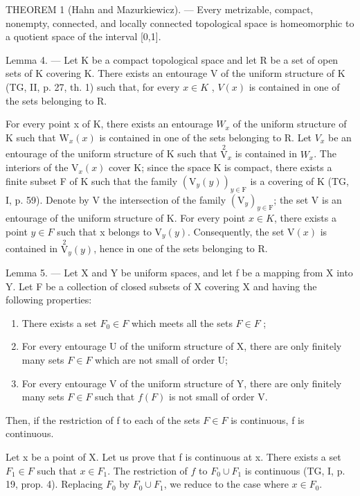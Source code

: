 THEOREM 1 (Hahn and Mazurkiewicz). --- Every metrizable, compact, nonempty, connected, and locally connected topological space is homeomorphic to a quotient space of the interval {[}0,1{]}.

Lemma 4. --- Let K be a compact topological space and let R be a set of open sets of K covering K. There exists an entourage V of the uniform structure of K (TG, II, p. 27, th. 1) such that, for every \(x \in K\) , \(V(x)\) is contained in one of the sets belonging to R.

For every point x of K, there exists an entourage \(W_{x}\) of the uniform structure of K such that \(\mathrm{W}_{x}(x)\) is contained in one of the sets belonging to R. Let \(V_{x}\) be an entourage of the uniform structure of K such that \(\overset{2}{\mathrm{V}}_{x}\) is contained in \(W_{x}\). The interiors of the \(\mathrm{V}_{x}(x)\) cover K; since the space K is compact, there exists a finite subset F of K such that the family \((\mathrm{V}_{y}(y))_{y\in\mathrm{F}}\) is a covering of K (TG, I, p. 59). Denote by V the intersection of the family \((\mathrm{V}_{y})_{y\in\mathrm{F}}\); the set V is an entourage of the uniform structure of K. For every point \(x\in K\), there exists a point \(y\in F\) such that x belongs to \(\mathrm{V}_{y}(y)\). Consequently, the set \(\mathrm{V}(x)\) is contained in \(\overset{2}{\mathrm{V}}_{y}(y)\), hence in one of the sets belonging to R.

Lemma 5. --- Let X and Y be uniform spaces, and let f be a mapping from X into Y. Let F be a collection of closed subsets of X covering X and having the following properties:

\begin{enumerate}
\def\labelenumi{(\roman{enumi})}
\item
  There exists a set \(F_{0} \in F\) which meets all the sets \(F \in F\) ;
\item
  For every entourage U of the uniform structure of X, there are only finitely many sets \(F \in F\) which are not small of order U;
\item
  For every entourage V of the uniform structure of Y, there are only finitely many sets \(F \in F\) such that \(f(F)\) is not small of order V.
\end{enumerate}

Then, if the restriction of f to each of the sets \(F \in F\) is continuous, f is continuous.

Let x be a point of X. Let us prove that f is continuous at x. There exists a set \(F_{1} \in F\) such that \(x \in F_{1}\). The restriction of \(f\) to \(F_{0} \cup F_{1}\) is continuous (TG, I, p. 19, prop. 4). Replacing \(F_{0}\) by \(F_{0} \cup F_{1}\), we reduce to the case where \(x \in F_{0}\).


